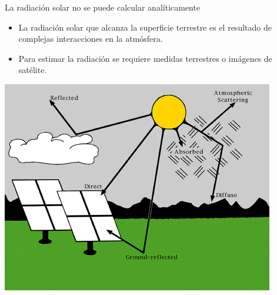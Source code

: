 \documentclass[xcolor={usenames,svgnames,dvipsnames}]{beamer}
\begin{document}
\begin{frame}[label={sec:org5405a20}]{La radiación solar no se puede calcular analíticamente}
\begin{itemize}
\item La radiación solar que alcanza la superficie terrestre es el resultado de complejas interacciones en la atmósfera.
\item Para estimar la radiación se requiere medidas terrestres o imágenes de satélite.
\end{itemize}
\begin{center}
\includegraphics[height=0.5\textheight]{../figs/SolarRadiationComponents_NREL.png}
\end{center}
\end{frame}
\end{document}
